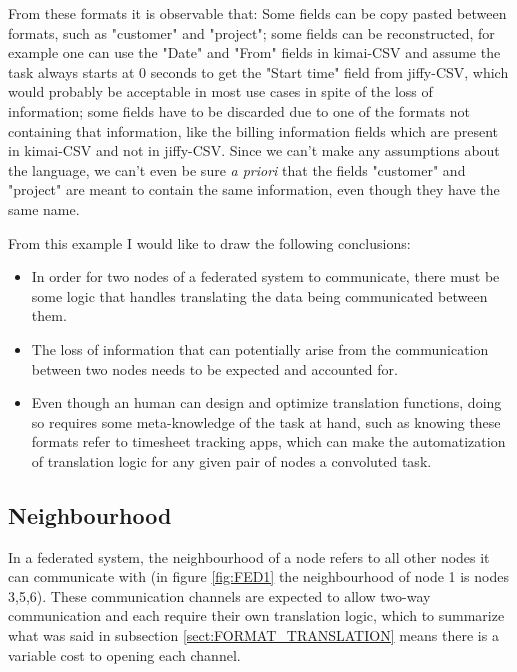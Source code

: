 \documentclass[journal]{IEEEtran}
\begin{document}
From these formats it is observable that: Some fields can be copy pasted between formats, such as "customer" and "project"; some fields can be reconstructed, for example one can use the "Date" and "From" fields in kimai-CSV and assume the task always starts at 0 seconds to get the "Start time" field from jiffy-CSV, which would probably be acceptable in most use cases in spite of the loss of information; some fields have to be discarded due to one of the formats not containing that information, like the billing information fields which are present in kimai-CSV and not in jiffy-CSV. Since we can't make any assumptions about the language, we can't even be sure \textit{a priori} that the fields "customer" and "project"  are meant to contain the same information, even though they have the same name.

From this example I would like to draw the following conclusions:

\begin{itemize}

	\item In order for two nodes of a federated system to communicate, there must be some logic that handles translating the data being communicated between them.

	\item The loss of information that can potentially arise from the communication between two nodes needs to be expected and accounted for.

	\item Even though an human can design and optimize translation functions, doing so requires some meta-knowledge of the task at hand, such as knowing these formats refer to timesheet tracking apps, which can make the automatization of translation logic for any given pair of nodes a convoluted task.

\end{itemize}

\subsection{Neighbourhood}

In a federated system, the neighbourhood of a node refers to all other nodes it can communicate with (in figure \ref{fig:FED1} the neighbourhood of node 1 is nodes 3,5,6). These communication channels are expected to allow two-way communication and each require their own translation logic, which to summarize what was said in subsection \ref{sect:FORMAT_TRANSLATION} means there is a variable cost to opening each channel.
\end{document}
